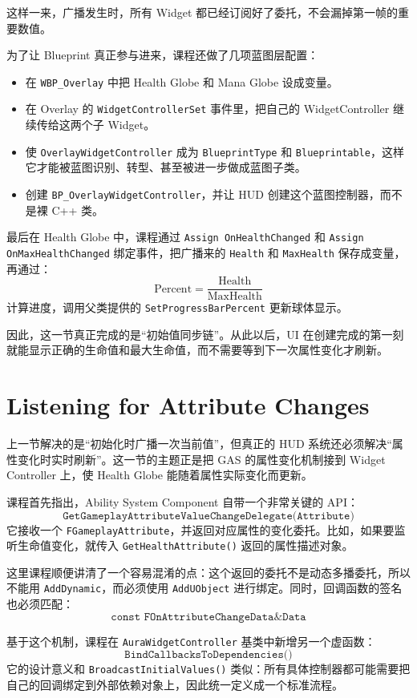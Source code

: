 这样一来，广播发生时，所有 Widget 都已经订阅好了委托，不会漏掉第一帧的重要数值。

为了让 Blueprint 真正参与进来，课程还做了几项蓝图层配置：
\begin{itemize}
	\item 在 \texttt{WBP\_Overlay} 中把 Health Globe 和 Mana Globe 设成变量。
	\item 在 Overlay 的 \texttt{WidgetControllerSet} 事件里，把自己的 WidgetController 继续传给这两个子 Widget。
	\item 使 \texttt{OverlayWidgetController} 成为 \texttt{BlueprintType} 和 \texttt{Blueprintable}，这样它才能被蓝图识别、转型、甚至被进一步做成蓝图子类。
	\item 创建 \texttt{BP\_OverlayWidgetController}，并让 HUD 创建这个蓝图控制器，而不是裸 C++ 类。
\end{itemize}

最后在 Health Globe 中，课程通过 \texttt{Assign OnHealthChanged} 和 \texttt{Assign OnMaxHealthChanged} 绑定事件，把广播来的 \texttt{Health} 和 \texttt{MaxHealth} 保存成变量，再通过：
\[
\text{Percent}=\frac{\text{Health}}{\text{MaxHealth}}
\]
计算进度，调用父类提供的 \texttt{SetProgressBarPercent} 更新球体显示。

因此，这一节真正完成的是“初始值同步链”。从此以后，UI 在创建完成的第一刻就能显示正确的生命值和最大生命值，而不需要等到下一次属性变化才刷新。

\section{Listening for Attribute Changes}

上一节解决的是“初始化时广播一次当前值”，但真正的 HUD 系统还必须解决“属性变化时实时刷新”。这一节的主题正是把 GAS 的属性变化机制接到 Widget Controller 上，使 Health Globe 能随着属性实际变化而更新。

课程首先指出，Ability System Component 自带一个非常关键的 API：
\[
\texttt{GetGameplayAttributeValueChangeDelegate(Attribute)}
\]
它接收一个 \texttt{FGameplayAttribute}，并返回对应属性的变化委托。比如，如果要监听生命值变化，就传入 \texttt{GetHealthAttribute()} 返回的属性描述对象。

这里课程顺便讲清了一个容易混淆的点：这个返回的委托不是动态多播委托，所以不能用 \texttt{AddDynamic}，而必须使用 \texttt{AddUObject} 进行绑定。同时，回调函数的签名也必须匹配：
\[
\texttt{const FOnAttributeChangeData\& Data}
\]

基于这个机制，课程在 \texttt{AuraWidgetController} 基类中新增另一个虚函数：
\[
\texttt{BindCallbacksToDependencies()}
\]
它的设计意义和 \texttt{BroadcastInitialValues()} 类似：所有具体控制器都可能需要把自己的回调绑定到外部依赖对象上，因此统一定义成一个标准流程。

